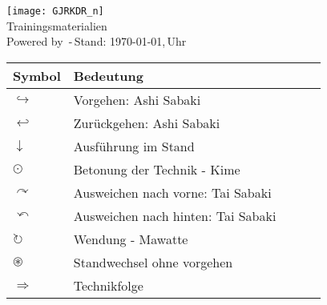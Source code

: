 \setcounter{num}{0}
\setcounter{numz}{0}
\begin{tcolorbox}[colframe=SGL2,colback=white,coltitle=black,title=G\={o}j\={u}-Ry\={u} Karate-D\={o} Langenfeld-Reusrath]
	\begin{center}
		\texttt{[image: GJRKDR\_n]}\\
		Trainingsmaterialien\\{\scriptsize \textsf{Powered by} \LaTeXe \textsf{\,-\,Stand: \today,\,\currenttime Uhr}} 
	\end{center}
\end{tcolorbox}
\clearpage
\pagebreak
\setcounter{num}{0}
\setcounter{numz}{0}	
\begin{tcolorbox}[colframe=SGL2,colback=white,coltitle=black,title=\section*{Allgemeines:\indent Erläuterungen}]
	\begin{tabularx}{\textwidth}{lllll}
		Symbol	& Bedeutung	& &&\\
		\midrule
		\(\hookrightarrow\) 	& Vorgehen: Ashi Sabaki					& & &\\
		\(\hookleftarrow\) 		& Zurückgehen: Ashi Sabaki				& & &\\
		\(\downarrow\) 			& Ausführung im Stand					& & &\\
		\(\odot\) 				& Betonung der Technik - Kime			& & &\\
		\(\curvearrowright\)	& Ausweichen nach vorne: Tai Sabaki		& & &\\
		\(\curvearrowleft\)		& Ausweichen nach hinten: Tai Sabaki	& & &\\
		\(\circlearrowright\)	& Wendung - Mawatte						& & &\\
		\(\circledast\)			& Standwechsel ohne vorgehen			& & &\\
		\(\Rightarrow\)			& Technikfolge							& & &\\
	\end{tabularx}
\end{tcolorbox}
\clearpage
\pagebreak
